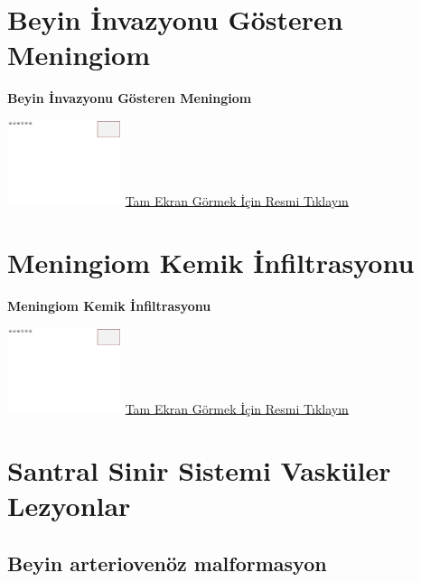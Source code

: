\documentclass[
  letterpaper,
  DIV=11,
  numbers=noendperiod]{scrreprt}
\begin{document}
\hypertarget{sec-beyin-invazyonu-gosteren-meningiom}{%
\chapter{Beyin İnvazyonu Gösteren
Meningiom}\label{sec-beyin-invazyonu-gosteren-meningiom}}

\textbf{Beyin İnvazyonu Gösteren Meningiom}

\href{https://images.patolojiatlasi.com/template/HE.html}{\includegraphics[width=0.25\textwidth,height=\textheight]{./screenshots/template_screenshot.png}}
\href{https://images.patolojiatlasi.com/brain-invasive-meningioma/HE.html}{Tam
Ekran Görmek İçin Resmi Tıklayın}

\hypertarget{sec-kemik-infiltrasyonu-gosteren-meningiom}{%
\chapter{Meningiom Kemik
İnfiltrasyonu}\label{sec-kemik-infiltrasyonu-gosteren-meningiom}}

\textbf{Meningiom Kemik İnfiltrasyonu}

\href{https://images.patolojiatlasi.com/template/HE.html}{\includegraphics[width=0.25\textwidth,height=\textheight]{./screenshots/template_screenshot.png}}
\href{https://images.patolojiatlasi.com/meningioma-bone-infiltration/HE.html}{Tam
Ekran Görmek İçin Resmi Tıklayın}

\hypertarget{sec-santral-sinir-sistemi-vaskuler}{%
\chapter{Santral Sinir Sistemi Vasküler
Lezyonlar}\label{sec-santral-sinir-sistemi-vaskuler}}

\hypertarget{sec-beyin-arteriovenoz-malformasyon}{%
\section{Beyin arteriovenöz
malformasyon}\label{sec-beyin-arteriovenoz-malformasyon}}
\end{document}
